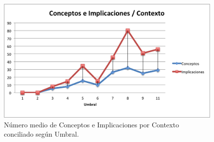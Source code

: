 \begin{figure}
\centering
\includegraphics[scale=0.75]{img/7/estconceptos}
\caption{Número medio de Conceptos e Implicaciones por Contexto conciliado según Umbral.
\label{fig:estconceptos}}
\end{figure}